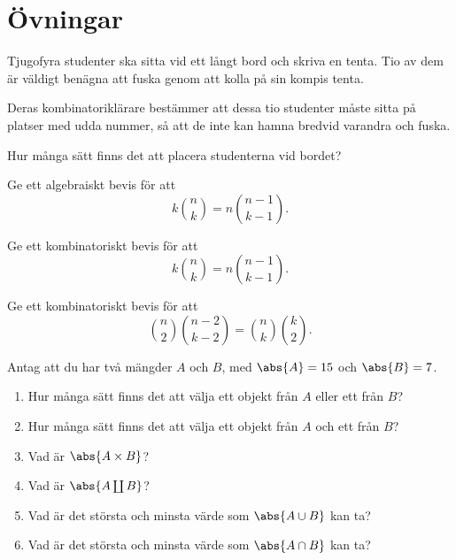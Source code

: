 \documentclass{tufte-handout}
\begin{document}
\newpage

\section{Övningar}

\begin{xca}
	Tjugofyra studenter ska sitta vid ett långt bord och skriva en tenta. Tio av dem är väldigt benägna att fuska genom att kolla på sin kompis tenta.

	Deras kombinatoriklärare bestämmer att dessa tio studenter måste sitta på platser med udda nummer, så att de inte kan hamna bredvid varandra och fuska.

	Hur många sätt finns det att placera studenterna vid bordet?
\end{xca}

\begin{xca}
	Ge ett algebraiskt bevis för att
	$$k\binom{n}{k} = n \binom{n-1}{k-1}.$$
\end{xca}
    
\begin{xca}
	Ge ett kombinatoriskt bevis för att
	$$k\binom{n}{k} = n \binom{n-1}{k-1}.$$
\end{xca}

\begin{xca}\label{xca:second_combinatorial_proof}
	Ge ett kombinatoriskt bevis för att
	$$\binom{n}{2}\binom{n-2}{k-2} = \binom{n}{k}\binom{k}{2}.$$
\end{xca}

\begin{xca}
	Antag att du har två mängder $A$ och $B$, med $\abs{A} = 15$ och $\abs{B} = 7$.
	\begin{enumerate}
		\item Hur många sätt finns det att välja ett objekt från $A$ eller ett från $B$?
		\item Hur många sätt finns det att välja ett objekt från $A$ och ett från $B$?
		\item Vad är $\abs{A\times B}$?
		\item Vad är $\abs{A \coprod B}$?
		\item Vad är det största och minsta värde som $\abs{A \cup B}$ kan ta?
		\item Vad är det största och minsta värde som $\abs{A \cap B}$ kan ta?
	\end{enumerate}
\end{xca}
\end{document}
